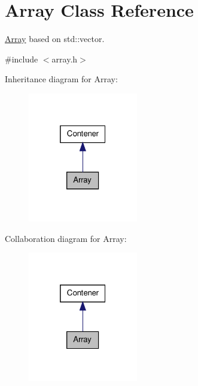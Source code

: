 \hypertarget{class_array}{\section{\-Array \-Class \-Reference}
\label{class_array}
}


\hyperlink{class_array}{\-Array} based on std\-::vector.  




{\ttfamily \#include $<$array.\-h$>$}



\-Inheritance diagram for \-Array\-:\nopagebreak
\begin{figure}[H]
\begin{center}
\leavevmode
\includegraphics[width=136pt]{class_array__inherit__graph}
\end{center}
\end{figure}


\-Collaboration diagram for \-Array\-:\nopagebreak
\begin{figure}[H]
\begin{center}
\leavevmode
\includegraphics[width=136pt]{class_array__coll__graph}
\end{center}
\end{figure}
